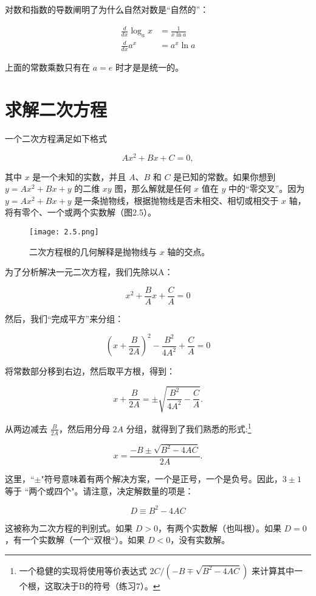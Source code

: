 \documentclass[lang=cn,12pt]{elegantbook}
\begin{document}
对数和指数的导数阐明了为什么自然对数是“自然的”：


$$
\begin{aligned}
\frac{d}{d x} \log _{a} x &=\frac{1}{x \ln a} \\
\frac{d}{d x} a^{x} &=a^{x} \ln a
\end{aligned}
$$

上面的常数乘数只有在 $a = e$ 时才是是统一的。

\section{求解二次方程}

一个二次方程满足如下格式

$$Ax^2+Bx+C=0,$$

其中 $x$ 是一个未知的实数，并且 $A$、$B$ 和 $C$ 是已知的常数。如果你想到 $y=Ax^2+Bx+y$ 的二维 $xy$ 图，那么解就是任何 $x$ 值在 $y$ 中的“零交叉”。因为 $y=Ax^2+Bx+y$ 是一条抛物线，根据抛物线是否未相交、相切或相交于 $x$ 轴，将有零个、一个或两个实数解（图2.5）。

\begin{figure}[htbp]
\centering
\texttt{[image: 2.5.png]}
\caption{二次方程根的几何解释是抛物线与 $x$ 轴的交点。}
\end{figure}

为了分析解决一元二次方程，我们先除以A：

$$x^2+\frac{B}{A} x+\frac{C}{A}=0$$

然后，我们“完成平方”来分组：

$$\left(x+\frac{B}{2 A}\right)^{2}-\frac{B^{2}}{4 A^{2}}+\frac{C}{A}=0$$

将常数部分移到右边，然后取平方根，得到：

$$
x+\frac{B}{2 A}=\pm \sqrt{\frac{B^{2}}{4 A^{2}}-\frac{C}{A}} .
$$

从两边减去 $\frac{B}{2 A}$，然后用分母 $2A$ 分组，就得到了我们熟悉的形式:\footnote{一个稳健的实现将使用等价表达式 $2 C /\left(-B \mp \sqrt{B^{2}-4 A C}\right)$ 来计算其中一个根，这取决于B的符号（练习7）。}


\begin{equation} x=\frac{-B \pm \sqrt{B^{2}-4 A C}}{2 A} . \end{equation}

这里，``$\pm$"符号意味着有两个解决方案，一个是正号，一个是负号。因此，$3\pm1$ 等于 ``两个或四个"。请注意，决定解数量的项是：

$$
D \equiv B^{2}-4 A C
$$

这被称为二次方程的判别式。如果 $D>0$，有两个实数解（也叫根）。如果 $D=0$，有一个实数解（一个``双根“）。如果 $D<0$，没有实数解。
\end{document}
